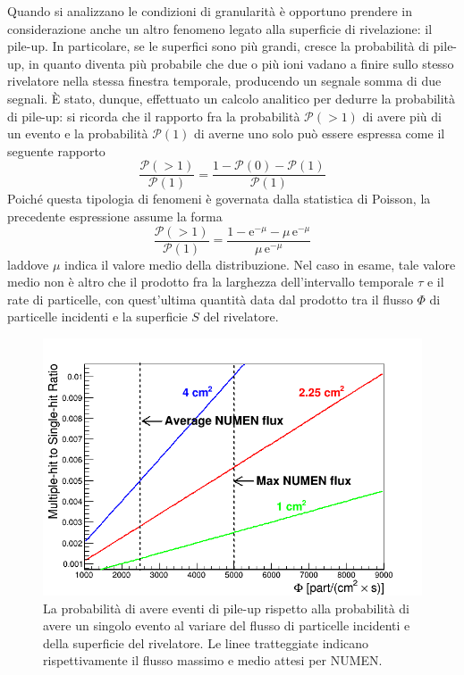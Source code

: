 Quando si analizzano le condizioni di granularità è opportuno prendere in considerazione anche un altro fenomeno legato alla superficie di rivelazione: il pile-up.
In particolare, se le superfici sono più grandi, cresce la probabilità di pile-up, in quanto diventa più probabile che due o più ioni vadano a finire sullo stesso rivelatore nella stessa finestra temporale, producendo un segnale somma di due segnali.
È stato, dunque, effettuato un calcolo analitico per dedurre la probabilità di pile-up: si ricorda che il rapporto fra la probabilità $\mathcal{P}(> \! 1)$ di avere più di un evento e la probabilità $\mathcal{P}(1)$ di averne uno solo può essere espressa come il seguente rapporto
\begin{equation}
\frac{\mathcal{P}(> \! 1)}{\mathcal{P}(1)} = \frac{1 - 
	\mathcal{P}(0) - \mathcal{P}(1)}{\mathcal{P}(1)}
\end{equation}
Poiché questa tipologia di fenomeni è governata dalla statistica di Poisson, la precedente espressione assume la forma
\begin{equation}  \label{eq:calcolo_pile-up}
\frac{\mathcal{P}(> \! 1)}{\mathcal{P}(1)} = \frac{1 - 
	\mbox{e}^{-\mu} - \mu \,\mbox{e}^{- \mu}}{\mu \, \mbox{e}^{- \mu}}
\end{equation}
laddove $\mu$ indica il valore medio della distribuzione.
Nel caso in esame, tale valore medio non è altro che il prodotto fra la larghezza dell'intervallo temporale $\tau$ e il rate di particelle, con quest'ultima quantità data dal prodotto tra il flusso $\Phi$ di particelle incidenti e la superficie $S$ del rivelatore.
\begin{figure} [!t]
	\centering
	\includegraphics[width=\textwidth, keepaspectratio]{Grafici_Tesi2/Granularita/pile-up3.png}
	\caption{La probabilità di avere eventi di pile-up rispetto alla probabilità di avere un singolo evento al variare del flusso di particelle incidenti e della superficie del rivelatore. Le linee tratteggiate indicano rispettivamente il flusso massimo e medio attesi per NUMEN.} \label{fig:pile-up}
\end{figure}
